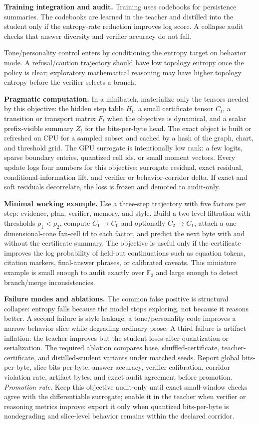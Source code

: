 \documentclass[10pt]{article}
\newcommand{\FF}{\mathbb{F}}
\numberwithin{equation}{section}
\begin{document}
\noindent\textbf{Training integration and audit.} Training uses codebooks for persistence summaries. The codebooks are learned in the teacher and distilled into the student only if the entropy-rate reduction improves log score. A collapse audit checks that answer diversity and verifier accuracy do not fall.

Tone/personality control enters by conditioning the entropy target on behavior mode. A refusal/caution trajectory should have low topology entropy once the policy is clear; exploratory mathematical reasoning may have higher topology entropy before the verifier selects a branch.

\noindent\textbf{Pragmatic computation.} In a minibatch, materialize only the tensors needed by this objective: the hidden step table $H_t$, a small certificate tensor $C_t$, a transition or transport matrix $F_t$ when the objective is dynamical, and a scalar prefix-visible summary $Z_t$ for the bits-per-byte head. The exact object is built or refreshed on CPU for a sampled subset and cached by a hash of the graph, chart, and threshold grid. The GPU surrogate is intentionally low rank: a few logits, sparse boundary entries, quantized cell ids, or small moment vectors. Every update logs four numbers for this objective: surrogate residual, exact residual, conditional-information lift, and verifier or behavior-corridor delta. If exact and soft residuals decorrelate, the loss is frozen and demoted to audit-only.

\noindent\textbf{Minimal working example.} Use a three-step trajectory with five factors per step: evidence, plan, verifier, memory, and style. Build a two-level filtration with thresholds $\rho_1<\rho_2$, compute $C_1\to C_0$ and optionally $C_2\to C_1$, attach a one-dimensional-cone fan-cell id to each factor, and predict the next byte with and without the certificate summary. The objective is useful only if the certificate improves the log probability of held-out continuations such as equation tokens, citation markers, final-answer phrases, or calibrated caveats. This miniature example is small enough to audit exactly over $\FF_2$ and large enough to detect branch/merge inconsistencies.

\noindent\textbf{Failure modes and ablations.} The common false positive is structural collapse: entropy falls because the model stops exploring, not because it reasons better. A second failure is style leakage: a tone/personality code improves a narrow behavior slice while degrading ordinary prose. A third failure is artifact inflation: the teacher improves but the student loses after quantization or serialization. The required ablation compares base, shuffled-certificate, teacher-certificate, and distilled-student variants under matched seeds. Report global bits-per-byte, slice bits-per-byte, answer accuracy, verifier calibration, corridor violation rate, artifact bytes, and exact audit agreement before promotion.
\vfill
\noindent\emph{Promotion rule.} Keep this objective audit-only until exact small-window checks agree with the differentiable surrogate; enable it in the teacher when verifier or reasoning metrics improve; export it only when quantized bits-per-byte is nondegrading and slice-level behavior remains within the declared corridor.
\clearpage
\end{document}
